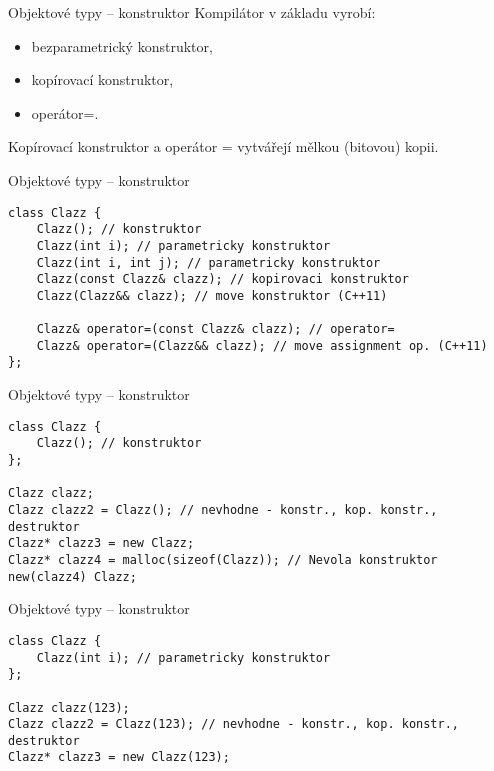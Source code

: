 \begin{frame}[fragile]
\begin{block}{Objektové typy -- konstruktor} 
Kompilátor v základu vyrobí:
\begin{itemize}
\item bezparametrický konstruktor,
\item kopírovací konstruktor,
\item operátor=.
\end{itemize}

Kopírovací konstruktor a operátor = vytvářejí mělkou (bitovou) kopii.

\end{block}
\end{frame}


\begin{frame}[fragile]
\begin{exampleblock}{Objektové typy -- konstruktor} 
\begin{lstlisting}
class Clazz {
	Clazz(); // konstruktor
	Clazz(int i); // parametricky konstruktor
	Clazz(int i, int j); // parametricky konstruktor
	Clazz(const Clazz& clazz); // kopirovaci konstruktor
	Clazz(Clazz&& clazz); // move konstruktor (C++11)
	
	Clazz& operator=(const Clazz& clazz); // operator=
	Clazz& operator=(Clazz&& clazz); // move assignment op. (C++11)
};

\end{lstlisting}
\end{exampleblock}
\end{frame}


\begin{frame}[fragile]
\begin{exampleblock}{Objektové typy -- konstruktor} 
\begin{lstlisting}
class Clazz {
	Clazz(); // konstruktor
};

Clazz clazz;
Clazz clazz2 = Clazz(); // nevhodne - konstr., kop. konstr., destruktor
Clazz* clazz3 = new Clazz;
Clazz* clazz4 = malloc(sizeof(Clazz)); // Nevola konstruktor
new(clazz4) Clazz;
\end{lstlisting}
\end{exampleblock}
\end{frame}


\begin{frame}[fragile]
\begin{exampleblock}{Objektové typy -- konstruktor} 
\begin{lstlisting}
class Clazz {
	Clazz(int i); // parametricky konstruktor
};

Clazz clazz(123);
Clazz clazz2 = Clazz(123); // nevhodne - konstr., kop. konstr., destruktor
Clazz* clazz3 = new Clazz(123);
\end{lstlisting}
\end{exampleblock}
\end{frame}



